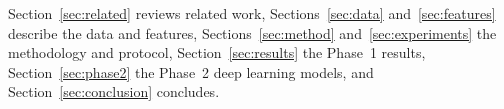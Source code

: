 Section~\ref{sec:related} reviews related work, Sections~\ref{sec:data} and~\ref{sec:features}
describe the data and features, Sections~\ref{sec:method} and~\ref{sec:experiments} the
methodology and protocol, Section~\ref{sec:results} the Phase~1 results, Section~\ref{sec:phase2} the Phase~2 deep learning
models, and Section~\ref{sec:conclusion} concludes.
